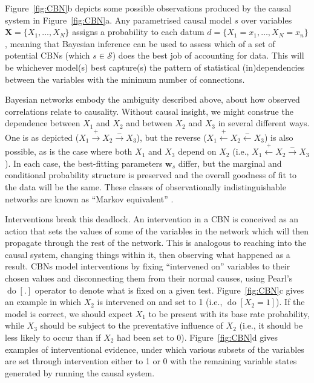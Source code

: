 \documentclass{cambridge7A}%
\DeclareMathOperator*{\Do}{do}
\newcommand{\ww}{\mathbf{w}} %
\newcommand{\dm}{d} %
\begin{document}
Figure~\ref{fig:CBN}b depicts some possible observations 
produced by the causal system in Figure~\ref{fig:CBN}a. 
Any parametrised causal model $s$ over variables $\mathbf{X} =\{X_1, \ldots, X_N\}$ assigns a probability to each datum ${\dm}=\{X_1=x_1, \ldots, X_N=x_n\}$, meaning that Bayesian inference can be used to assess which of a set of potential CBNs (which $s\in\mathcal{S}$) does the best job of accounting for data.  This will be whichever model(s) best capture(s) the pattern of statistical (in)dependencies between the variables with the minimum number of connections.

Bayesian networks embody the ambiguity described above, about how observed correlations relate to causality.  Without causal insight, we might construe the dependence between $X_1$ and $X_2$ and between $X_2$ and $X_3$ in several different ways.  One is as depicted ($X_1\!\stackrel{+}\rightarrow\!X_2\!\stackrel{-}\rightarrow\!X_3$), but the reverse ($X_1\!\stackrel{+}\leftarrow\!X_2\!\stackrel{-}\leftarrow\!X_3$) is also possible, as is the case where both $X_1$ and $X_3$ depend on $X_2$ (i.e., $X_1\!\stackrel{+}\leftarrow\!X_2\!\stackrel{-}\rightarrow\!X_3$).  In each case, the best-fitting parameters $\ww_s$ differ, but the marginal and conditional probability structure is preserved and the overall goodness of fit to the data will be the same.  These classes of observationally indistinguishable networks are known as ``Markov equivalent'' \citep{pearl2000causality}.

Interventions break this deadlock.  An intervention in a CBN is conceived as an action that sets the values of some of the variables in the network which will then propagate through the rest of the network.   This is analogous to reaching into the causal system, changing things within it, then observing what happened as a result. CBNs model interventions by fixing ``intervened on'' variables to their chosen values and disconnecting them from their normal causes, using Pearl's $\Do[.]$ operator \citep{pearl2000causality} to denote what is fixed on a given test.  Figure~\ref{fig:CBN}c gives an example in which $X_2$ is intervened on and set to 1 (i.e., $\Do[X_2=1]$).  If the model is correct, we should expect $X_1$ to be present with its base rate probability, while $X_3$ should be subject to the preventative influence of $X_2$ (i.e., it should be less likely to occur than if $X_2$ had been set to 0).  Figure~\ref{fig:CBN}d gives examples of interventional evidence, under which various subsets of the variables are set through intervention either to 1 or 0 with the remaining variable states generated by running the causal system.
\end{document}
